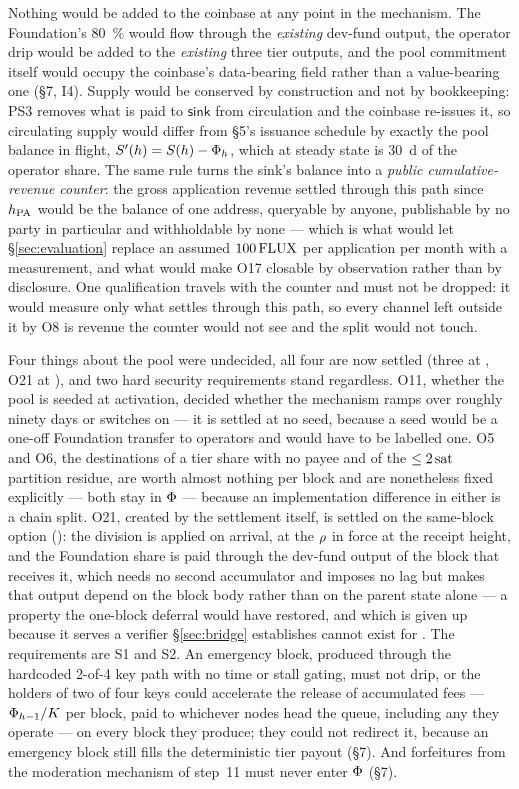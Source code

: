 Nothing would be added to the coinbase at any point in the mechanism. The Foundation's
\SI{80}{\percent} would flow through the \emph{existing} dev-fund output, the operator drip would be
added to the \emph{existing} three tier outputs, and the pool commitment itself would occupy the
coinbase's data-bearing field rather than a value-bearing one (\S7, I4). Supply would be conserved by
construction and not by bookkeeping: PS3 removes what is paid to $\mathsf{sink}$ from circulation and
the coinbase re-issues it, so circulating supply would differ from \S5's issuance schedule by exactly
the pool balance in flight, $S'(h) = S(h) - \Phi_{h}$, which at steady state is
\SI{30}{\day} of the operator share. The same rule turns the sink's balance into a
\emph{public cumulative-revenue counter}: the gross application revenue settled through this path
since $h_{\mathrm{PA}}$ would be the balance of one address, queryable by anyone, publishable by no party in
particular and withholdable by none --- which is what would let \S\ref{sec:evaluation} replace an assumed $100\,\mathrm{FLUX}$
per application per month with a measurement, and what would make O17 closable by observation rather
than by disclosure. One qualification travels with the counter and must not be dropped: it would
measure only what settles through this path, so every channel left outside it by O8 is revenue the
counter would not see and the split would not touch.

Four things about the pool were undecided, all four are now settled (three at
, O21 at ), and two hard security requirements stand
regardless. O11, whether the pool is seeded at activation,
decided whether the mechanism ramps over roughly ninety days or switches on --- it is settled at no
seed, because a seed would be a one-off Foundation transfer to operators and would have to be
labelled one. O5 and O6, the destinations of a tier share with no payee and of the $\le 2\,\mathrm{sat}$
partition residue, are worth almost nothing per block and are nonetheless fixed explicitly --- both
stay in $\Phi$ --- because an implementation difference in either is a chain split. O21, created by
the settlement itself, is settled on the same-block option (): the division is
applied on arrival, at the $\rho$ in force at the receipt height, and the Foundation share is
paid through the dev-fund output of the block that receives it, which needs no second accumulator
and imposes no lag but makes that output depend on the block body rather than on the parent state
alone --- a property the one-block deferral would have restored, and which is given up because it
serves a verifier \S\ref{sec:bridge} establishes cannot exist for \Flux. The requirements are S1 and
S2. An emergency block, produced through the hardcoded 2-of-4 key path with no time or stall gating,
must not drip, or the holders of two of four keys could accelerate the release of accumulated fees
--- $\Phi_{h-1}/K$ per block, paid to whichever nodes head the queue, including any they
operate --- on every block they produce; they could not redirect it, because an emergency block
still fills the deterministic tier payout (\S7). And forfeitures from the moderation mechanism of
step~11 must never enter $\Phi$ (\S7).

